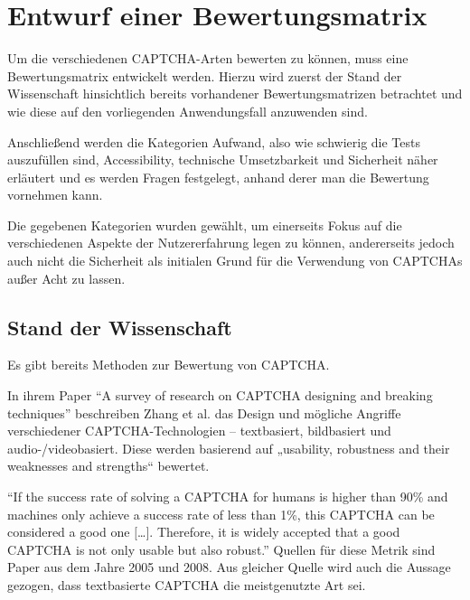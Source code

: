 \chapter{Entwurf einer Bewertungsmatrix}
\label{ch:matrix}

Um die verschiedenen CAPTCHA-Arten bewerten zu können, muss eine Bewertungsmatrix entwickelt werden. 
Hierzu wird zuerst der Stand der Wissenschaft hinsichtlich bereits vorhandener Bewertungsmatrizen betrachtet 
und wie diese auf den vorliegenden Anwendungsfall anzuwenden sind. 

Anschließend werden die Kategorien Aufwand, also wie schwierig die Tests auszufüllen sind, Accessibility, technische Umsetzbarkeit 
und Sicherheit näher erläutert und es werden Fragen festgelegt, anhand derer man die Bewertung vornehmen kann.

Die gegebenen Kategorien wurden gewählt, um einerseits Fokus auf die verschiedenen Aspekte der Nutzererfahrung legen zu können,
andererseits jedoch auch nicht die Sicherheit als initialen Grund für die Verwendung von CAPTCHAs außer Acht zu lassen.

\section{Stand der Wissenschaft}
\label{ch:matrix:sdw}

Es gibt bereits Methoden zur Bewertung von CAPTCHA.

In ihrem Paper ``A survey of research on CAPTCHA designing and breaking techniques'' beschreiben Zhang et al. das Design 
und mögliche Angriffe verschiedener CAPTCHA-Technologien – textbasiert, bildbasiert und audio-/videobasiert. 
Diese werden basierend auf „usability, robustness and their weaknesses and strengths“ bewertet. %

``If the success rate of solving a CAPTCHA for humans is higher than 90\% and machines only achieve 
a success rate of less than 1\%, this CAPTCHA can be considered a good one $[$\dots$]$. 
Therefore, it is widely accepted that a good CAPTCHA is not only usable but also robust.'' %
Quellen für diese Metrik sind Paper aus dem Jahre 2005 und 2008. 
Aus gleicher Quelle wird auch die Aussage gezogen, dass textbasierte CAPTCHA die meistgenutzte Art sei. 


